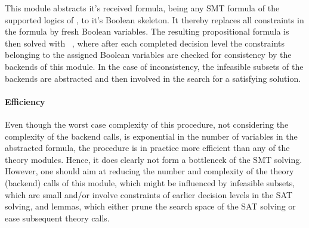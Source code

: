 This module abstracts it's received formula, being any SMT formula of the supported logics of \smtrat, to it's Boolean skeleton. It thereby replaces all constraints in the formula by fresh Boolean variables. The resulting propositional formula is then solved with \minisat~\cite{minisat}, where after each completed decision level the constraints belonging to the assigned Boolean variables are checked for consistency by the backends of this module. In the case of inconsistency, the infeasible subsets of the backends are abstracted and then involved in the search for a satisfying solution.

\paragraph{Efficiency} Even though the worst case complexity of this procedure, not considering the complexity of the backend calls, is exponential in the number of variables in the abstracted formula, the procedure is in practice more efficient than any of the theory modules. Hence, it does clearly not form a bottleneck of the SMT solving. However, one should aim at reducing the number and complexity of the theory (backend) calls of this module, which might be influenced by infeasible subsets, which are small and/or involve constraints of earlier decision levels in the SAT solving, and lemmas, which either prune the search space of the SAT solving or ease subsequent theory calls.
